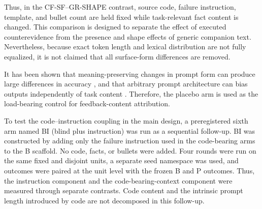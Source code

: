 \documentclass{article}
\numberwithin{equation}{section}  %
\theoremstyle{definition}
\newcommand{\armP}{\textsf{P}}
\newcommand{\armB}{\textsf{B}}
\newcommand{\armCF}{\textsf{CF-SF}}
\newcommand{\armGR}{\textsf{GR-SHAPE}}
\newcommand{\armBI}{\textsf{BI}}
\begin{document}
Thus, in the \armCF{}--\armGR{} contrast, source code, failure instruction, template, and
bullet count are held fixed while task-relevant fact content is changed. This comparison is
designed to separate the effect of executed counterevidence from the presence and shape effects
of generic companion text. Nevertheless, because exact token length and lexical distribution
are not fully equalized, it is not claimed that all surface-form differences are removed.

It has been shown that meaning-preserving changes in prompt form can produce large differences
in accuracy \citep{sclar2024formatting}, and that arbitrary prompt architecture can bias
outputs independently of task content \citep{brucks2025prompt}. Therefore, the placebo arm is
used as the load-bearing control for feedback-content attribution.

To test the code--instruction coupling in the main design, a preregistered sixth arm named
\armBI{} (blind plus instruction) was run as a sequential follow-up. \armBI{} was constructed
by adding only the failure instruction used in the code-bearing arms to the \armB{} scaffold.
No code, facts, or bullets were added. Four rounds were run on the same fixed and disjoint
units, a separate seed namespace was used, and outcomes were paired at the unit level with the
frozen \armB{} and \armP{} outcomes. Thus, the instruction component and the code-bearing-context
component were measured through separate contrasts. Code content and the intrinsic prompt
length introduced by code are not decomposed in this follow-up.
\end{document}
